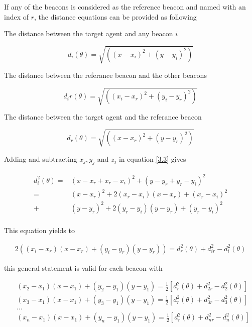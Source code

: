 If any of the beacons is considered as the reference beacon and named with an index of $r$, the distance equations can be provided as following

The distance between the target agent and any beacon $i$

\begin{equation} \label{3.3}
d_i(\theta) = \sqrt{\left((x - x_i)^2 + (y - y_i)^2\right)}
\end{equation}

The distance between the referance beacon and the other beacons

\begin{equation}
d_ir(\theta) = \sqrt{\left((x_i - x_r)^2 + (y_i - y_r)^2\right)}
\end{equation}

The distance between the target agent and the referance beacon

\begin{equation}
d_r(\theta) = \sqrt{\left((x - x_r)^2 + (y - y_r)^2\right)}
\end{equation}

Adding and subtracting $x_j, y_j$ and $z_j$ in equation \ref{3.3} gives

\begin{align*}
d_i^2(\theta) = & (x - x_r + x_r - x_i)^2 + (y - y_r + y_r - y_i)^2 \\
              = & (x - x_r)^2 + 2(x_r - x_i)(x - x_r) + (x_r-x_i)^2 \\ 
              + & (y - y_r)^2 + 2(y_r - y_i)(y - y_r) + (y_r - y_i)^2 \\               
\end{align*}

This equation yields to

\begin{align*}
 2((x_i - x_r)(x - x_r) + (y_i - y_r)(y - y_r)) = d_r^2(\theta) + d_{ir}^2 - d_i^2(\theta)
\end{align*}

this general statement is valid for each beacon with

\begin{align*}
& (x_2 - x_1)(x - x_1) + (y_2 - y_1)(y - y_1) = \frac{1}{2} [d_r^2(\theta) + d_{2r}^2 - d_2^2(\theta)] \\
& (x_3 - x_1)(x - x_1) + (y_3 - y_1)(y - y_1) = \frac{1}{2} [d_r^2(\theta) + d_{3r}^2 - d_3^2(\theta)] \\
& ... \\
& (x_n - x_1)(x - x_1) + (y_n - y_1)(y - y_1) = \frac{1}{2} [d_r^2(\theta) + d_{nr}^2 - d_n^2(\theta)] \\
\end{align*}

